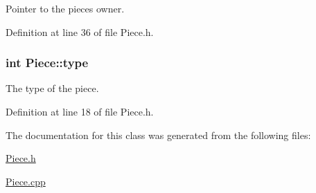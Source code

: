 Pointer to the pieces owner. 



Definition at line 36 of file Piece.\-h.

\hypertarget{classPiece_a5c3c79a15de7daa1efde1b8aa246e8d4}{
\subsubsection[{type}]{\setlength{\rightskip}{0pt plus 5cm}int Piece\-::type\hspace{0.3cm}{\ttfamily [protected]}}}\label{classPiece_a5c3c79a15de7daa1efde1b8aa246e8d4}


The type of the piece. 



Definition at line 18 of file Piece.\-h.



The documentation for this class was generated from the following files\-:\begin{DoxyCompactItemize}
\item 
\hyperlink{Piece_8h}{Piece.\-h}\item 
\hyperlink{Piece_8cpp}{Piece.\-cpp}\end{DoxyCompactItemize}
